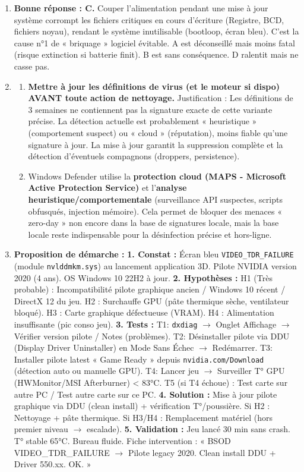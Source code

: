 \documentclass[11pt]{article}
\begin{document}
\begin{corrige}[Exercice n°1]
\begin{enumerate}
    \item \textbf{Bonne réponse : C.} Couper l'alimentation pendant une mise à jour système corrompt les fichiers critiques en cours d'écriture (Registre, BCD, fichiers noyau), rendant le système inutilisable (bootloop, écran bleu). C'est la cause n°1 de « briquage » logiciel évitable. A est déconseillé mais moins fatal (risque extinction si batterie finit). B est sans conséquence. D ralentit mais ne casse pas.
    \item \begin{enumerate}
        \item \textbf{Mettre à jour les définitions de virus (et le moteur si dispo) AVANT toute action de nettoyage.} Justification : Les définitions de 3 semaines ne contiennent pas la signature exacte de cette variante précise. La détection actuelle est probablement « heuristique » (comportement suspect) ou « cloud » (réputation), moins fiable qu'une signature à jour. La mise à jour garantit la suppression complète et la détection d'éventuels compagnons (droppers, persistence).
        \item Windows Defender utilise la \textbf{protection cloud (MAPS - Microsoft Active Protection Service)} et l'\textbf{analyse heuristique/comportementale} (surveillance API suspectes, scripts obfusqués, injection mémoire). Cela permet de bloquer des menaces « zero-day » non encore dans la base de signatures locale, mais la base locale reste indispensable pour la désinfection précise et hors-ligne.
    \end{enumerate}
    \item \textbf{Proposition de démarche :}
    \textbf{1. Constat :} Écran bleu \texttt{VIDEO\_TDR\_FAILURE} (module \texttt{nvlddmkm.sys}) au lancement application 3D. Pilote NVIDIA version 2020 (4 ans). OS Windows 10 22H2 à jour.
    \textbf{2. Hypothèses :} H1 (Très probable) : Incompatibilité pilote graphique ancien / Windows 10 récent / DirectX 12 du jeu. H2 : Surchauffe GPU (pâte thermique sèche, ventilateur bloqué). H3 : Carte graphique défectueuse (VRAM). H4 : Alimentation insuffisante (pic conso jeu).
    \textbf{3. Tests :} T1: \texttt{dxdiag} $\to$ Onglet Affichage $\to$ Vérifier version pilote / Notes (problèmes). T2: Désinstaller pilote via DDU (Display Driver Uninstaller) en Mode Sans Échec $\to$ Redémarrer. T3: Installer pilote latest « Game Ready » depuis \texttt{nvidia.com/Download} (détection auto ou manuelle GPU). T4: Lancer jeu $\to$ Surveiller T° GPU (HWMonitor/MSI Afterburner) < 83°C. T5 (si T4 échoue) : Test carte sur autre PC / Test autre carte sur ce PC.
    \textbf{4. Solution :} Mise à jour pilote graphique via DDU (clean install) + vérification T°/poussière. Si H2 : Nettoyage + pâte thermique. Si H3/H4 : Remplacement matériel (hors premier niveau $\to$ escalade).
    \textbf{5. Validation :} Jeu lancé 30 min sans crash. T° stable 65°C. Bureau fluide. Fiche intervention : « BSOD VIDEO\_TDR\_FAILURE $\to$ Pilote legacy 2020. Clean install DDU + Driver 550.xx. OK. »
\end{enumerate}
\end{corrige}
\end{document}
